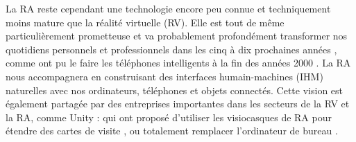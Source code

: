 La RA reste cependant une technologie encore peu connue et techniquement moins mature que la réalité virtuelle (RV). Elle est tout de même particulièrement prometteuse et va probablement profondément transformer nos quotidiens personnels et professionnels dans les cinq à dix prochaines années , comme ont pu le faire les téléphones intelligents à la fin des années 2000 \citep{Chaffey2018}. La RA nous accompagnera en construisant des interfaces humain-machines (IHM) naturelles avec nos ordinateurs, téléphones et objets connectés. Cette vision est également partagée par des entreprises importantes dans les secteurs de la RV et la RA, comme Unity :  \citep{UnityFutureMRPartIII2017} qui ont proposé d'utiliser les visiocasques de RA pour étendre des cartes de visite , ou totalement remplacer l'ordinateur de bureau .


